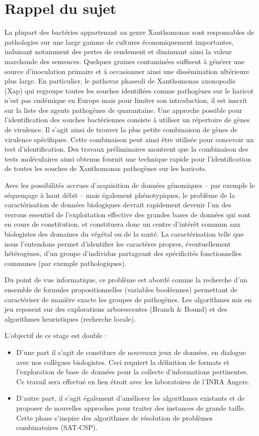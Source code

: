 \documentclass[a4paper,12pt]{article}
\begin{document}
\section*{Rappel du sujet}
\par La plupart des bactéries appartenant au genre Xanthomonas sont responsables de pathologies sur
une large gamme de cultures économiquement importantes, induisant notamment des pertes
de rendement et diminuant ainsi la valeur marchande des semences. Quelques graines
contaminées suffisent à générer une source d'inoculation primaire et à occasionner ainsi une
dissémination ultérieure plus large. En particulier, le pathovar phaseoli de Xanthomonas axonopodis
(Xap) qui regroupe toutes les souches identifiées comme pathogènes sur le haricot n'est pas
endémique en Europe mais pour limiter son introduction, il est inscrit sur la liste des agents
pathogènes de quarantaine. Une approche possible pour l'identification des souches bactériennes
consiste à utiliser un répertoire de gènes de virulence. Il s'agit ainsi de trouver la plus petite
combinaison de gènes de virulence spécifiques. Cette combinaison peut ainsi être utilisée pour
concevoir un test d'identification. Des travaux préliminaires montrent que la combinaison des
tests moléculaires ainsi obtenus fournit une technique rapide pour l'identification de toutes les
souches de Xanthomonas pathogènes sur les haricots.
\par Avec les possibilités accrues d'acquisition de données génomiques – par exemple le séquençage à
haut débit – mais également phénotypiques, le problème de la caractérisation de données
biologiques devrait rapidement devenir l'un des verrous essentiel de l'exploitation effective des
grandes bases de données qui sont en cours de constitution, et constituera donc un centre d'intérêt
commun aux biologistes des domaines du végétal ou de la santé. La caractérisation telle que nous
l'entendons permet d'identifier les caractères propres, éventuellement hétérogènes, d'un groupe
d’individus partageant des spécificités fonctionnelles communes (par exemple pathologiques).
\par Du point de vue informatique, ce problème est abordé comme la recherche d'un ensemble de
formules propositionnelles (variables booléennes) permettant de caractériser de manière exacte les
groupes de pathogènes. Les algorithmes mis en jeu reposent sur des explorations arborescentes
(Branch \& Bound) et des algorithmes heuristiques (recherche locale).
\par L'objectif de ce stage est double :
\begin{itemize}
\item D'une part il s'agit de constituer de nouveaux jeux de données, en dialogue avec nos collègues
biologistes. Ceci requiert la définition de formats et l'exploration de base de données pour la collecte
d'informations pertinentes. Ce travail sera effectué en lien étroit avec les laboratoires de l'INRA
Angers.
\item D'autre part, il s'agit également d'améliorer les algorithmes existants et de proposer de nouvelles
approches pour traiter des instances de grande taille. Cette phase s'inspire des algorithmes de
résolution de problèmes combinatoires (SAT-CSP).
\end{itemize}
\end{document}
